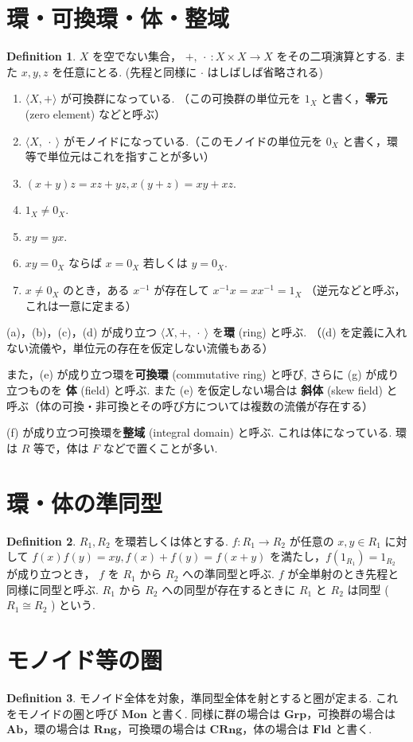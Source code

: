 \documentclass[paper=b4, landscape, twocolumn, column_gap=2zw, head_space=15mm, foot_space=15mm, font_size=5pt, jafontscale=0.9, line_length=40zw]{jlreq}
\theoremstyle{definition}
\newtheorem{definition}{Definition}[section]
\begin{document}
 \section{環・可換環・体・整域}
 \begin{definition}
  $X$ を空でない集合， $+,\ \cdot\ : X \times X \rightarrow X$ をその二項演算とする. また $x, y, z$ を任意にとる. (先程と同様に $\cdot$ はしばしば省略される)
  \begin{enumerate}
   \item $\langle X, +\rangle$ が可換群になっている. （この可換群の単位元を $1_X$ と書く，\textbf{零元} (zero element) などと呼ぶ）
   \item $\langle X, \ \cdot\ \rangle$ がモノイドになっている.（このモノイドの単位元を $0_X$ と書く，環等で単位元はこれを指すことが多い）
   \item $(x + y)z = xz + yz, x(y+z)=xy+xz$.
   \item $1_X \neq 0_X$.
   \item $xy = yx$.
   \item $xy=0_X$ ならば $x=0_X$ 若しくは $y=0_X$.
   \item $x \neq 0_X$ のとき，ある $x^{-1}$ が存在して $x^{-1}x = xx^{-1}=1_X$ （逆元などと呼ぶ，これは一意に定まる）
  \end{enumerate}

  (a)，(b)，(c)，(d) が成り立つ $\langle X, +, \ \cdot\ \rangle$ を\textbf{環} (ring) と呼ぶ. （(d) を定義に入れない流儀や，単位元の存在を仮定しない流儀もある）

また，(e) が成り立つ環を\textbf{可換環} (commutative ring) と呼び, さらに (g) が成り立つものを \textbf{体} (field) と呼ぶ. また (e) を仮定しない場合は \textbf{斜体} (skew field) と呼ぶ（体の可換・非可換とその呼び方については複数の流儀が存在する）

(f) が成り立つ可換環を\textbf{整域} (integral domain) と呼ぶ. これは体になっている. 環は $R$ 等で，体は $F$ などで置くことが多い.
 \end{definition}

 \section{環・体の準同型}
 \begin{definition}
  $R_1, R_2$ を環若しくは体とする. $f : R_1 \rightarrow R_2$ が任意の $x, y ∈ R_1$ に対して $f(x)f(y) = xy, f(x)+f(y)=f(x+y)$ を満たし，$f(1_{R_1}) = 1_{R_2}$ が成り立つとき， $f$ を $R_1$ から $R_2$ への準同型と呼ぶ. $f$ が全単射のとき先程と同様に同型と呼ぶ. $R_1$ から $R_2$ への同型が存在するときに $R_1$ と $R_2$ は同型 ( $R_1 \cong R_2$ ) という.
 \end{definition}

 \section{モノイド等の圏}
\begin{definition}
 モノイド全体を対象，準同型全体を射とすると圏が定まる. これをモノイドの圏と呼び $\mathbf{Mon}$ と書く. 同様に群の場合は $\mathbf{Grp}$，可換群の場合は $\mathbf{Ab}$，環の場合は $\mathbf{Rng}$，可換環の場合は $\mathbf{CRng}$，体の場合は $\mathbf{Fld}$ と書く.
\end{definition}
\end{document}

